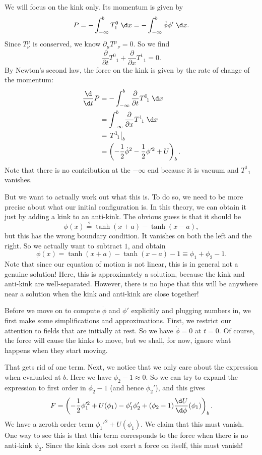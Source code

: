 \documentclass[a4paper]{article}
\begin{document}
We will focus on the kink only. Its momentum is given by
\[
  P = - \int_{-\infty}^b T^0_1 \;\d x = - \int_{-\infty}^b \dot{\phi} \phi' \;\d x.
\]
Since $T^\mu_\nu$ is conserved, we know $\partial_\mu T^\mu\!_\nu = 0$. So we find
\[
  \frac{\partial}{\partial t} T^0\!_1 + \frac{\partial}{\partial x}T^1\!_1 = 0.
\]
By Newton's second law, the force on the kink is given by the rate of change of the momentum:
\begin{align*}
  \frac{\d}{\d t} P &= -\int_{-\infty}^b \frac{\partial}{\partial t} T^0\!_1\;\d x \\
  &= \int_{-\infty}^b \frac{\partial}{\partial x} T^1\!_1\;\d x\\
  &= \left.T^1\!_1\right|_b\\
  &= \left(-\frac{1}{2} \dot{\phi}^2 - \frac{1}{2} \phi'^2 + U\right)_b.
\end{align*}
Note that there is no contribution at the $-\infty$ end because it is vacuum and $T^1\!_1$ vanishes.

But we want to actually work out what this is. To do so, we need to be more precise about what our initial configuration is. In this theory, we can obtain it just by adding a kink to an anti-kink. The obvious guess is that it should be
\[
  \phi(x) \overset{?}{=} \tanh(x + a) - \tanh(x - a),
\]
but this has the wrong boundary condition. It vanishes on both the left and the right. So we actually want to subtract $1$, and obtain
\[
  \phi(x) = \tanh(x + a) - \tanh(x - a) - 1 \equiv \phi_1 + \phi_2 - 1.
\]
Note that since our equation of motion is not linear, this is in general not a genuine solution! Here, this is approximately a solution, because the kink and anti-kink are well-separated. However, there is no hope that this will be anywhere near a solution when the kink and anti-kink are close together!

Before we move on to compute $\dot{\phi}$ and $\phi'$ explicitly and plugging numbers in, we first make some simplifications and approximations. First, we restrict our attention to fields that are initially at rest. So we have $\dot{\phi} = 0$ at $t = 0$. Of course, the force will cause the kinks to move, but we shall, for now, ignore what happens when they start moving.

That gets rid of one term. Next, we notice that we only care about the expression when evaluated at $b$. Here we have $\phi_2 - 1 \approx 0$. So we can try to expand the expression to first order in $\phi_2 - 1$ (and hence $\phi_2'$), and this gives
\[
  F =  \left(-\frac{1}{2}\phi_1'^2 + U(\phi_1) - \phi_1' \phi_2' + (\phi_2 - 1) \frac{\d U}{\d \phi}(\phi_1)\right)_b.
\]
We have a zeroth order term $\phi_1'^2 + U(\phi_1)$. We claim that this must vanish. One way to see this is that this term corresponds to the force when there is no anti-kink $\phi_2$. Since the kink does not exert a force on itself, this must vanish!
\end{document}
